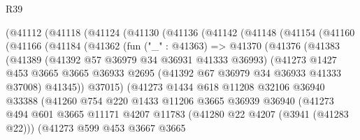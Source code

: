 \begin{lexlean}{R39}
\begin{coremodule}
          (@41112
            (@41118
              (@41124
                (@41130
                  (@41136
                    (@41142
                      (@41148
                        (@41154
                          (@41160
                            (@41166
                              (@41184
                                (@41362
                                  (fun ("_" : @41363) =>
                                  @41370
                                    (@41376
                                      (@41383
                                        (@41389
                                          (@41392 @57 @36979 @34 @36931 @41333 @36993)
                                          (@41273
                                            @1427
                                            @453
                                            @3665
                                            @3665
                                            @36933
                                            @2695
                                            (@41392 @67 @36979 @34 @36933 @41333 @37008)
                                            @41345))
                                        @37015)
                                      (@41273
                                        @1434
                                        @618
                                        @11208
                                        @32106
                                        @36940
                                        @33388
                                        (@41260
                                          @754
                                          @220
                                          @1433
                                          @11206
                                          @3665
                                          @36939
                                          @36940
                                          (@41273
                                            @494
                                            @601
                                            @3665
                                            @11171
                                            @4207
                                            @11783
                                            (@41280 @22 @4207 (@3941 (@41283 @22)))
                                            (@41273
                                              @599
                                              @453
                                              @3667
                                              @3665

\end{coremodule}
\end{lexlean}
